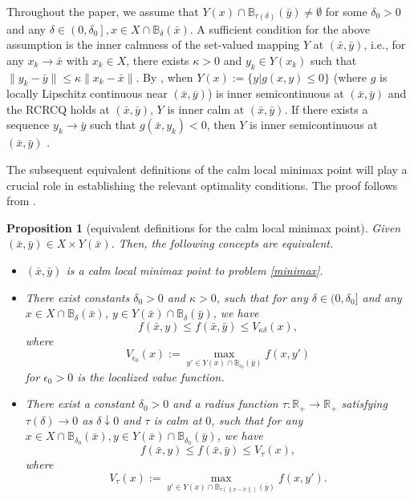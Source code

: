 \documentclass[11pt]{article}
\numberwithin{equation}{section}
\newtheorem{proposition}{Proposition}[section]
\begin{document}
{%
Throughout the paper, we assume that $Y(x)\cap\mathbb{B}_{\tau( \delta)}(\bar y) \not= \emptyset$ for some $\delta_0 >0$ and any $\delta \in\left(0, \delta_0\right], x \in X\cap \mathbb{B}_{\delta}(\bar x)$.  A sufficient condition for the above assumption is the inner calmness of the set-valued mapping $Y$ at $(\bar x,\bar y)$, i.e., for any $x_k \to \bar x$ with $x_k \in X$, there exists $\kappa >0$ and $y_k \in Y(x_k)$ such that $\|y_k -\bar y\| \leq \kappa \|x_k -\bar x\|$. By \cite[Theorem 5.2]{Bednarczuk2020}, when $Y(x):=\{y|g(x,y) \leq 0\}$ (where $g$ is locally Lipschitz continuous near $(\bar x, \bar y)$) is inner semicontinuous at $(\bar x,\bar y)$ and the RCRCQ holds at $(\bar x,\bar y)$, $Y$ is inner calm at $(\bar x,\bar y)$. If there exists a sequence $y_k \to \bar y$ such that $g(\bar x,y_k) <0$, then $Y$ is inner semicontinuous at $(\bar x,\bar y)$ \cite[Lemma 5.2]{Still2018}.



The subsequent equivalent definitions of the calm local minimax point will play a crucial role in establishing the relevant optimality conditions. The proof follows from \cite[Proposition 3.1, Lemma 3.1, Proposition 3.2]
{Ma2023}.

\begin{proposition}[equivalent definitions for the calm local minimax point]
\label{prop3.1}
Given $(\bar x,\bar y) \in X \times Y(\bar x)$. Then, the following concepts are equivalent.
\begin{itemize}
\item[(i)] $(\bar x,\bar y)$ is a calm local minimax point to problem \eqref{minimax}.
\item[(ii)] There exist constants $\delta_0>0$ and $\kappa>0$, such that for any $\delta\in(0, \delta_0]$ and any $x\in X\cap \mathbb{B}_{\delta}(\bar{x})$, $y\in Y(\bar x)\cap \mathbb{B}_{\delta}(\bar{y})$, we have
			\begin{equation}\label{equiv1}
				f(\bar{x}, y) \leq f(\bar{x},\bar{y})
				\leq V_{\kappa \delta}(x),
			\end{equation}
		where 
		\begin{equation}\label{localv}	V_{\epsilon_0}(x):=\max_{y' \in  Y(x)\cap\mathbb{B}_{\epsilon_0}(\bar y)} f (x, y' )\end{equation} for  $\epsilon_0 >0$ is the localized value function. 
\item[(iii)] There exist a constant $\delta_0>0$ and a radius function $\tau: \mathbb{R}_{+} \rightarrow \mathbb{R}_{+}$ satisfying $\tau(\delta) \rightarrow 0$ as $\delta \downarrow 0$ and $\tau$ is calm at $0$, such that for any $x\in X\cap \mathbb{B}_{\delta_0}(\bar x), y\in Y(\bar x)\cap \mathbb{B}_{\delta_0}(\bar y)$, we have
\begin{equation*}\label{equiv11}
f(\bar{x}, y) \leq f(\bar{x}, \bar{y}) \leq V_{\tau}(x),
\end{equation*}
where
\begin{equation}\label{localizedV}
V_{\tau}(x):=\max_{y' \in Y(x) \cap \mathbb{B}_{\tau(\|x-\bar x\|)}(\bar y)} f(x,y').
\end{equation}


\end{itemize}
\end{proposition}}
\end{document}
